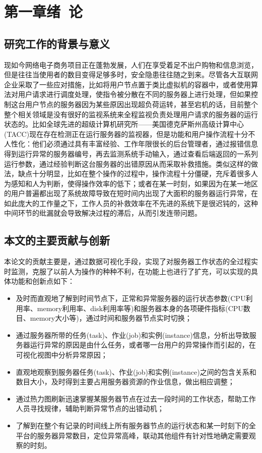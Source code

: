 
\chapter{第一章\quad 绪\ 论}
\section{研究工作的背景与意义}
现如今网络电子商务项目正在蓬勃发展，人们在享受着足不出户购物和信息浏览，但是往往当使用者的数目变得足够多时，安全隐患往往随之到来。尽管各大互联网企业采取了一些应对措施，比如将用户节点置于类比虚拟机的容器中，或者使用算法对用户请求进行调度处理，使指令被分散在不同的服务器上进行处理，但如果控制这台用户节点的服务器因为某些原因出现超负荷运转，甚至宕机的话，目前整个整个相关领域是没有很好的监视系统来全程监视负责处理用户请求的服务器的运行状态的。比如全球先进的超级计算机研究所——美国德克萨斯州高级计算中心(TACC)现在存在检测正在运行服务器的监视器，但是功能和用户操作流程十分不人性化：他们必须通过具有丰富经验、工作年限很长的后台管理者，通过报错信息得到运行异常的服务器编号，再去监测系统手动输入，通过查看后端返回的一系列运行参数，通过经验判断这台服务器的出错原因从而采取补救措施。类似这样的做法，缺点十分明显，比如在整个操作的过程中，操作流程十分僵硬，充斥着很多人为感知和人为判断，使得操作效率的低下；或者在某一时刻，如果因为在某一地区的用户普遍都出现了系统故障导致在短时间内出现了大面积的服务器运行异常，在如此庞大的工作量之下，工作人员的补救效率在不先进的系统下是很迟钝的，这种中间环节的纰漏就会导致解决过程的滞后，从而引发连带问题。
\section{本文的主要贡献与创新}
本论文的贡献主要是，通过数据可视化手段，实现了对服务器工作状态的全过程实时监测，克服了以前人为操作的种种不利，在功能上也进行了扩充，可以实现的具体功能和创新点如下：
\begin{itemize}
	\item 及时而直观地了解到时间节点下，正常和异常服务器的运行状态参数(CPU利用率、memory利用率、disk利用率等)和服务器本身的各项硬件指标(CPU数目、memory大小等)，通过时间和服务器节点实时切换；
	
	\item 通过服务器所带的任务(task)、作业(job)和实例(instance)信息，分析出导致服务器运行异常的原因是由什么任务，或者哪一台用户的异常操作而引起的，在可视化视图中分析异常原因；
	
	\item 直观地观察到服务器任务(task)、作业(job)和实例(instance)之间的包含关系和数目大小，及时得到主要占用服务器资源的作业信息，做出相应调整；
	
	\item 通过热力图刷新迅速掌握某服务器节点在过去一段时间的工作状态，帮助工作人员寻找规律，辅助判断异常节点的出错动机；
	
	\item 了解到在整个有记录的时间线上所有服务器节点的运行状态和某一时刻下的全平台的服务器异常数目，定位异常高峰，联动其他组件有针对性地确定需要观察的时刻。

\end{itemize}
	
